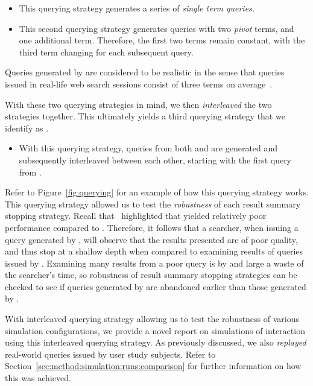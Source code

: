 \begin{itemize}
    \item{ This querying strategy generates a series of \emph{single term queries.}}
    \item{ This second querying strategy generates queries with two \emph{pivot} terms, and one additional term. Therefore, the first two terms remain constant, with the third term changing for each subsequent query.}
\end{itemize}

Queries generated by  are considered to be realistic in the sense that queries issued in real-life web search sessions consist of three terms on average~\citep{keskustalo2009querying}.

With these two querying strategies in mind, we then \emph{interleaved} the two strategies together. This ultimately yields a third querying strategy that we identify as .

\begin{itemize}
    \item{ With this querying strategy, queries from both  and  are generated and subsequently interleaved between each other, starting with the first query from .}
\end{itemize}

Refer to Figure~\ref{fig:querying} for an example of how this querying strategy works. This querying strategy allowed us to test the \emph{robustness} of each result summary stopping strategy. Recall that~\cite{keskustalo2009querying} highlighted that  yielded relatively poor performance compared to . Therefore, it follows that a searcher, when issuing a query generated by , will observe that the results presented are of poor quality, and thus stop at a shallow depth when compared to examining results of queries issued by . Examining many results from a poor query is by and large a waste of the searcher's time, so robustness of result summary stopping strategies can be checked to see if queries generated by  are abandoned earlier than those generated by .

With interleaved querying strategy  allowing us to test the robustness of various simulation configurations, we provide a novel report on simulations of interaction using this interleaved querying strategy. As previously discussed, we also \emph{replayed} real-world queries issued by user study subjects. Refer to Section~\ref{sec:method:simulation:runs:comparison} for further information on how this was achieved.

